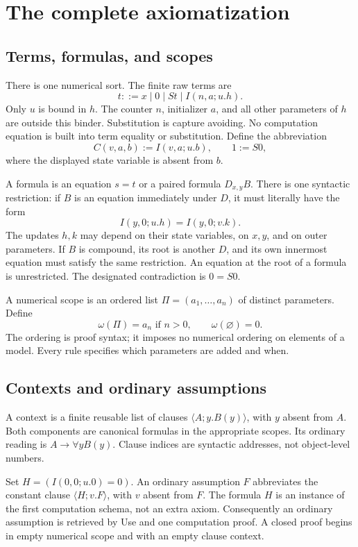 \documentclass[11pt]{article}
\theoremstyle{definition}\newtheorem{definition}[theorem]{Definition}
\theoremstyle{remark}\newtheorem{remark}[theorem]{Remark}
\newcommand{\wt}{\omega}
\begin{document}
\section{The complete axiomatization}
\label{sec:calculus}

\subsection{Terms, formulas, and scopes}

There is one numerical sort. The finite raw terms are
\[
 t ::= x\mid 0\mid St\mid I(n,a;u.h).
\]
Only $u$ is bound in $h$. The counter $n$, initializer $a$, and all other
parameters of $h$ are outside this binder. Substitution is capture avoiding.
No computation equation is built into term equality or substitution.
Define the abbreviation
\[
 C(v,a,b):=I(v,a;u.b),\qquad 1:=S0,
\]
where the displayed state variable is absent from $b$.

A formula is an equation $s=t$ or a paired formula $D_{x,y}B$. There is
one syntactic restriction: if $B$ is an equation immediately under $D$,
it must literally have the form
\[
 I(y,0;u.h)=I(y,0;v.k).                 \tag{Guard}
\]
The updates $h,k$ may depend on their state variables, on $x,y$, and on
outer parameters. If $B$ is compound, its root is another $D$, and its
own innermost equation must satisfy the same restriction. An equation at
the root of a formula is unrestricted. The designated contradiction is
$0=S0$.

A numerical scope is an ordered list
$\Pi=(a_1,\ldots,a_n)$ of distinct parameters. Define
\[
 \boxed{\ \wt(\Pi)=a_n\text{ if }n>0,\qquad
               \wt(\varnothing)=0.\ }                 \tag{1}
\]
The ordering is proof syntax; it imposes no numerical ordering on elements
of a model. Every rule specifies which parameters are added and when.

\subsection{Contexts and ordinary assumptions}

A context is a finite reusable list of clauses $\langle A;y.B(y)\rangle$,
with $y$ absent from $A$. Both components are canonical formulas in the
appropriate scopes. Its ordinary reading is
$A\to\forall y B(y)$. Clause indices are syntactic addresses, not
object-level numbers.

Set $H=(I(0,0;u.0)=0)$. An ordinary assumption $F$ abbreviates the
constant clause $\langle H;v.F\rangle$, with $v$ absent from $F$.
The formula $H$ is an instance of the first computation schema, not an
extra axiom. Consequently an ordinary assumption is retrieved by Use
and one computation proof. A closed proof begins in empty numerical
scope and with an empty clause context.
\end{document}
